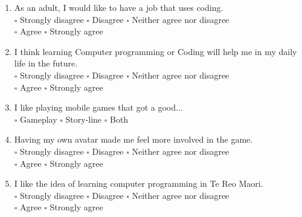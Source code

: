 \documentclass[12pt]{article}\pagestyle{myheadings}
\theoremstyle{plain}
\begin{document}
\begin{mdframed}
\begin{enumerate}
\item As an adult, I would like to have a job that uses coding. \\ 
$\square$ Strongly disagree $\square$ Disagree $\square$ Neither agree nor disagree\\ $\square$ Agree $\square$ Strongly agree



\item I think learning Computer programming or Coding will help me in my daily life in the future.\\
$\square$ Strongly disagree $\square$ Disagree $\square$ Neither agree nor disagree \\$\square$ Agree $\square$ Strongly agree

\item I like playing mobile games that got a good...\\
$\square$  Gameplay $\square$ Story-line $\square$ Both

\item Having my own avatar made me feel more involved in the game.\\
$\square$ Strongly disagree $\square$ Disagree $\square$ Neither agree nor disagree \\$\square$ Agree $\square$ Strongly agree


\item I like the idea of learning computer programming in Te Reo Maori.\\
$\square$ Strongly disagree $\square$ Disagree $\square$ Neither agree nor disagree \\$\square$ Agree $\square$ Strongly agree\\
\\
\end{enumerate}

\end{mdframed}
\end{document}
